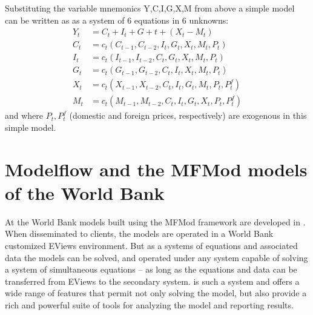 \documentclass[letterpaper,10pt,english]{jupyterBook}
\begin{document}
\sphinxAtStartPar
Substituting the variable mnemonics Y,C,I,G,X,M from above a simple model can be written as as a system of 6 equations in 6 unknowns:
\begin{align*}
Y_t  &=  C_t+I_t+G+t+ (X_t-M_t) \\
C_t &= c_t(C_{t-1},C_{t-2},I_t,G_t,X_t,M_t,P_t)\\
I_t &= c_t(I_{t-1},I_{t-2},C_t,G_t,X_t,M_t,P_t)\\
G_t &= c_t(G_{t-1},G_{t-2},C_t,I_t,X_t,M_t,P_t)\\
X_t &= c_t(X_{t-1},X_{t-2},C_t,I_t,G_t,M_t,P_t,P^f_t)\\
M_t &= c_t(M_{t-1},M_{t-2},C_t,I_t,G_t,X_t,P_t,P^f_t)
\end{align*}
\sphinxAtStartPar
and where \(P_t, P^f_t\) (domestic and foreign prices, respectively) are exogenous in this simple model.

\sphinxstepscope


\chapter{Modelflow and the MFMod models of the World Bank}
\label{\detokenize{content/02_MacrostructuralModels/MFModAndModelFlow:modelflow-and-the-mfmod-models-of-the-world-bank}}\label{\detokenize{content/02_MacrostructuralModels/MFModAndModelFlow::doc}}
\sphinxAtStartPar
At the World Bank models built using the MFMod framework are developed in . When disseminated to clients, the models are operated in a World Bank customized EViews environment. But as a systems of equations and associated data the models can be solved, and operated under any system capable of solving a system of simultaneous equations – as long as the equations and data can be transferred from EViews to the secondary system.  is such a system and offers a wide range of features that permit not only solving the model, but also provide a rich and powerful suite of tools for analyzing the model and reporting results.
\end{document}
